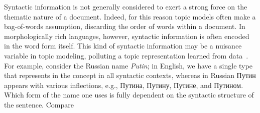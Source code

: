 \documentclass[11pt,letterpaper]{article}
\begin{document}
Syntactic information is not generally considered to exert a strong
force on the thematic nature of a document.  Indeed, for this reason
topic models often make a bag-of-words assumption, discarding the order
of words within a document.  In morphologically rich languages,
however, syntactic information is often encoded in the word form
itself.  This kind of syntactic information may be a nuisance variable
in topic modeling, polluting a topic representation
learned from data~\cite{boydgraber2014}.
For example, consider the Russian name
{\em Putin}; in English, we have a single type that represents in the
concept in all syntactic contexts, whereas in Russian
{ Путин} appears with various inflections,
e.g., {Путина},
{Путину}, {Путине},
and {Путином}. Which form of the name one uses
is fully dependent on the syntactic structure of the sentence. Compare
\end{document}
